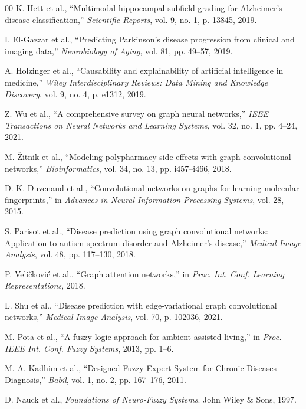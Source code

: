 \documentclass[journal,twoside,web]{ieeecolor}
\begin{document}
\begin{thebibliography}{00}
K. Hett et al., ``Multimodal hippocampal subfield grading for Alzheimer's disease classification,'' \textit{Scientific Reports}, vol. 9, no. 1, p. 13845, 2019.

I. El-Gazzar et al., ``Predicting Parkinson's disease progression from clinical and imaging data,'' \textit{Neurobiology of Aging}, vol. 81, pp. 49--57, 2019.

A. Holzinger et al., ``Causability and explainability of artificial intelligence in medicine,'' \textit{Wiley Interdisciplinary Reviews: Data Mining and Knowledge Discovery}, vol. 9, no. 4, p. e1312, 2019.

Z. Wu et al., ``A comprehensive survey on graph neural networks,'' \textit{IEEE Transactions on Neural Networks and Learning Systems}, vol. 32, no. 1, pp. 4--24, 2021.

M. \v{Z}itnik et al., ``Modeling polypharmacy side effects with graph convolutional networks,'' \textit{Bioinformatics}, vol. 34, no. 13, pp. i457--i466, 2018.

D. K. Duvenaud et al., ``Convolutional networks on graphs for learning molecular fingerprints,'' in \textit{Advances in Neural Information Processing Systems}, vol. 28, 2015.

S. Parisot et al., ``Disease prediction using graph convolutional networks: Application to autism spectrum disorder and Alzheimer's disease,'' \textit{Medical Image Analysis}, vol. 48, pp. 117--130, 2018.

P. Veli\v{c}kovi\'{c} et al., ``Graph attention networks,'' in \textit{Proc. Int. Conf. Learning Representations}, 2018.

L. Shu et al., ``Disease prediction with edge-variational graph convolutional networks,'' \textit{Medical Image Analysis}, vol. 70, p. 102036, 2021.

M. Pota et al., ``A fuzzy logic approach for ambient assisted living,'' in \textit{Proc. IEEE Int. Conf. Fuzzy Systems}, 2013, pp. 1--6.

M. A. Kadhim et al., ``Designed Fuzzy Expert System for Chronic Diseases Diagnosis,'' \textit{Babil}, vol. 1, no. 2, pp. 167--176, 2011.

D. Nauck et al., \textit{Foundations of Neuro-Fuzzy Systems}. John Wiley \& Sons, 1997.


\end{thebibliography}
\end{document}
